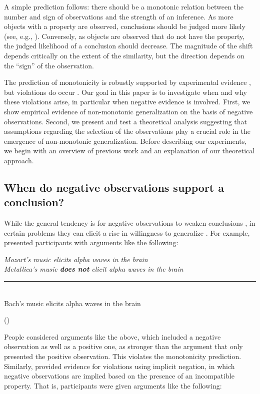 \documentclass[authoryear,11pt]{elsarticle}
\newcounter{quotecount}
\newcommand{\MyQuote}[1]{\vspace{.5cm}\addtocounter{quotecount}{1}%
     \parbox{13cm}{\em #1}\hspace*{1cm}(\arabic{quotecount})\\[0cm]\vspace{.5cm}}
\begin{document}
A simple prediction follows: there should be a monotonic relation between the number and sign of observations and the strength of an inference. As more objects with a property are observed, conclusions should be judged more likely (see, e.g., \citealt{Hayesetal2010, Heit2000, Lopez1995, Oshersonetal1990}). Conversely, as objects are observed that do not have the property, the judged likelihood of a conclusion should decrease. The magnitude of the shift depends critically on the extent of the similarity, but the direction depends on the ``sign'' of the observation.

The prediction of monotonicity is robustly supported by experimental evidence \citep{Oshersonetal1990, Oshersonetal1991, Smithetal1993}, but violations do occur \citep{Heussenetal2011, KalishLawson2007, Medinetal2003, Oshersonetal1990}. Our goal in this paper is to investigate when and why these violations arise, in particular when negative evidence is involved. First, we show empirical evidence of non-monotonic generalization on the basis of negative observations. Second, we present and test a theoretical analysis suggesting that assumptions regarding the selection of the observations play a crucial role in the emergence of non-monotonic generalization. Before describing our experiments, we begin with an overview of previous work and an explanation of our theoretical approach.

\subsection{When do negative observations support a conclusion?}

While the general tendency is for negative observations to weaken conclusions \citep{Oshersonetal1991}, in certain problems they can elicit a rise in willingness to generalize \citep{KalishLawson2007,Heussenetal2011}. For example, \citet{Heussenetal2011} presented participants with arguments like the following:

\MyQuote{Mozart's music elicits alpha waves in the brain\\
Metallica's music \textbf{does not} elicit alpha waves in the brain\\[-5pt]
\rule[0pt]{250pt}{1pt} \\[-2pt]
Bach's music elicits alpha waves in the brain
}

\noindent
People considered arguments like the above, which included a negative observation as well as a positive one, as stronger than the argument that only presented the positive observation. This violates the monotonicity prediction. Similarly, \citet{KalishLawson2007} provided evidence for violations using implicit negation, in which negative observations are implied based on the presence of an incompatible property. That is, participants were given arguments like the following:
\end{document}

